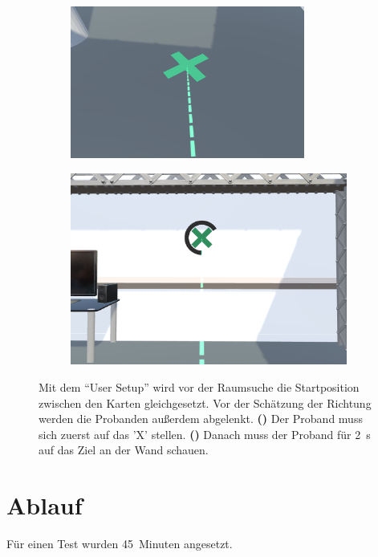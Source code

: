 \begin{figure}[h]
    \begin{subfigure}{0.49\linewidth}
        \centering
        \includegraphics[width=\linewidth, height=5cm]{figures/screenshots/user_setup_floor}
        \caption{}
        \label{sfig:user_setup_floor}
    \end{subfigure}%
    \hfill
    \begin{subfigure}{0.49\linewidth}
        \centering
        \includegraphics[width=\linewidth]{figures/screenshots/user_setup_wall}
        \caption{}
        \label{sfig:user_setup_wall}
    \end{subfigure}
    \caption{Mit dem \enquote{User Setup} wird vor der Raumsuche die Startposition zwischen den Karten gleichgesetzt. %
    Vor der Schätzung der Richtung werden die Probanden außerdem abgelenkt. %
    \textbf{()} Der Proband muss sich zuerst auf das 'X' stellen. %
    \textbf{()} Danach muss der Proband für \SI{2}{\second} auf das Ziel an der Wand schauen.}
    \label{fig:user_setup}
\end{figure}

\section{Ablauf}
Für einen Test wurden \num{45}~Minuten angesetzt.

